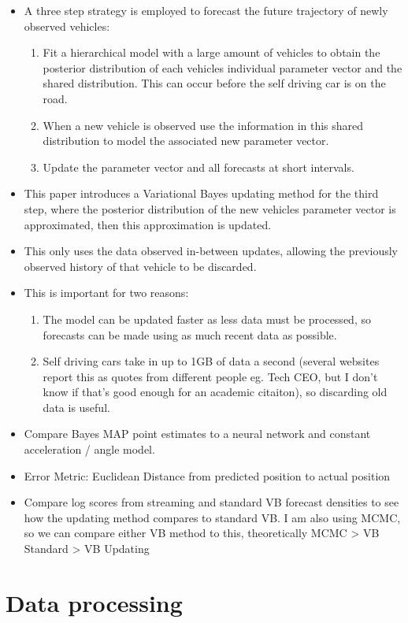 \documentclass[12pt,a4paper]{article}\usepackage[]{graphicx}\usepackage[]{color}
\begin{document}
\begin{itemize}
\item A three step strategy is employed to forecast the future trajectory of newly observed vehicles:
\begin{enumerate}
\item Fit a hierarchical model with a large amount of vehicles to obtain the posterior distribution of each vehicles individual parameter vector and the shared distribution. This can occur before the self driving car is on the road.
\item When a new vehicle is observed use the information in this shared distribution to model the associated new parameter vector. 
\item Update the parameter vector and all forecasts at short intervals.
\end{enumerate}
\item This paper introduces a Variational Bayes updating method for the third step, where the posterior distribution of the new vehicles parameter vector is approximated, then this approximation is updated.
\item This only uses the data observed in-between updates, allowing the previously observed history of that vehicle to be discarded.
\item This is important for two reasons:
\begin{enumerate}
\item The model can be updated faster as less data must be processed, so forecasts can be made using as much recent data as possible.
\item Self driving cars take in up to 1GB of data a second (several websites report this as quotes from different people eg. Tech CEO, but I don't know if that's good enough for an academic citaiton), so discarding old data is useful.
\end{enumerate}
\item Compare Bayes MAP point estimates to a neural network and constant acceleration / angle model.
\item Error Metric: Euclidean Distance from predicted position to actual position
\item Compare log scores from streaming and standard VB forecast densities to see how the updating method compares to standard VB. I am also using MCMC, so we can compare either VB method to this, theoretically MCMC > VB Standard > VB Updating
\end{itemize}

\section{Data processing}
\end{document}
